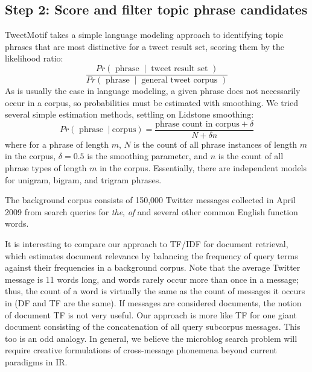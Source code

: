 \documentclass[letterpaper]{article}
\newcommand{\bto}[1]{\textcolor{blue}{\textbf{[#1 --BTO]}}}
\newcommand{\codenote}[1]{}
\begin{document}

\subsection{Step 2: Score and filter topic phrase candidates}
\codenote{lang_model.py, ranking.py}
TweetMotif takes a simple language modeling approach to identifying topic phrases that are most distinctive for a tweet result set, scoring them by the likelihood ratio:
\[\frac{Pr(\textrm{ phrase } \ |\ \textrm{ tweet result set })}
{Pr(\textrm{ phrase } \ |\ \textrm{ general tweet corpus })}
\]
As is usually the case in language modeling, a given phrase does not necessarily occur in a corpus, so probabilities must be estimated with smoothing.  We tried several simple estimation methods, settling on Lidstone smoothing:
\[ Pr(\textrm{ phrase }\ |\ \textrm{corpus}) = \frac
{ \textrm{phrase count in corpus} + \delta }
{ N + \delta n }
\]
where for a phrase of length $m$, $N$ is the count of all phrase instances of length $m$ in the corpus, $\delta=0.5$ is the smoothing parameter, and $n$ is the count of all phrase types of length $m$ in the corpus.  Essentially, there are independent models for unigram, bigram, and trigram phrases.


The background corpus consists of 150,000 Twitter messages collected in April 2009 from search queries for \emph{the}, \emph{of} and several other common English function words.

It is interesting to compare our approach to TF/IDF for document retrieval, which estimates document relevance by balancing the frequency of query terms against their frequencies in a background corpus.  Note that the average Twitter message is 11 words long, and words rarely occur more than once in a message; thus, the count of a word is virtually the same as the count of messages it occurs in (DF and TF are the same).  If messages are considered documents, the notion of document TF is not very useful.  Our approach is more like TF for one giant document consisting of the concatenation of all query subcorpus messages.  This too is an odd analogy.  In general, we believe the microblog search problem will require creative formulations of cross-message phonemena beyond current paradigms in IR.
\end{document}
